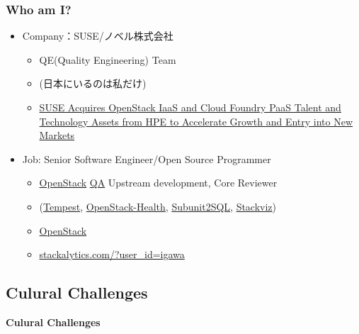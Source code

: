 \documentclass[aspectratio=169,11pt,hyperref={colorlinks=true}]{beamer}
\begin{document}
\begin{frame}
  \frametitle{Who am I?}
  \begin{itemize}
    \item Company：SUSE/ノベル株式会社
      \begin{itemize}
        \item QE(Quality Engineering) Team
        \item[] (日本にいるのは私だけ)
        \item \href{https://www.suse.com/newsroom/post/2016/suse-acquires-openstack-iaas-and-cloud-foundry-paas-talent-and-technology-assets-from-hpe-to-accelerate-growth-and-entry-into-new-markets/}{SUSE Acquires OpenStack IaaS and Cloud Foundry PaaS Talent and Technology Assets from HPE to Accelerate Growth and Entry into New Markets}
      \end{itemize}
    \item Job: Senior Software Engineer/Open Source Programmer
      \begin{itemize}
        \item \href{https://www.openstack.org/}{OpenStack}
         \href{https://wiki.openstack.org/wiki/QA}{QA} Upstream development, Core Reviewer
        \item[] (\href{https://docs.openstack.org/developer/tempest/}{Tempest},
         \href{http://status.openstack.org/openstack-health/}{OpenStack-Health},
         \href{https://docs.openstack.org/developer/subunit2sql/}{Subunit2SQL},
         \href{https://docs.openstack.org/developer/stackviz/}{Stackviz})
        \item \href{https://www.openstack.org/}{OpenStack}
        \item \href{http://stackalytics.com/?user_id=igawa&release=all&metric=all}{stackalytics.com/?user\_id=igawa}
      \end{itemize}
  \end{itemize}
\end{frame}

\subsection{Culural Challenges}
\begin{frame}
  \bf\Huge{Culural Challenges}
\end{frame}
\end{document}

